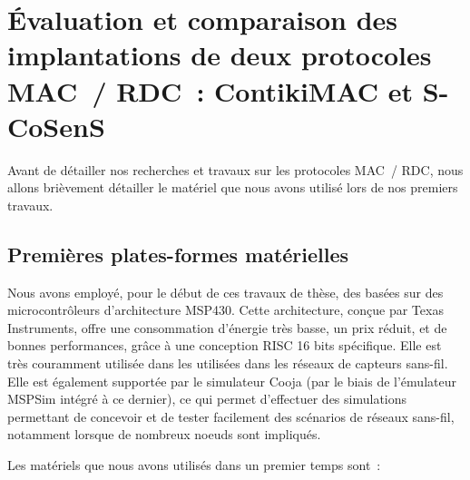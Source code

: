 
\chapter{Évaluation et comparaison des implantations
         de deux protocoles MAC~/ RDC~: ContikiMAC et S-CoSenS}
\label{ChProtocolesMAC}

Avant de détailler nos recherches et travaux sur les protocoles MAC~/
RDC, nous allons brièvement détailler le matériel que nous avons
utilisé lors de nos premiers travaux.


\section{Premières plates-formes matérielles}
\label{SecHWMSP430}

Nous avons employé, pour le début de ces travaux de thèse, des 
basées sur des microcontrôleurs d'architecture MSP430. Cette architecture,
conçue par Texas Instruments, offre une consommation d'énergie très basse,
un prix réduit, et de bonnes performances, grâce à une conception RISC
16 bits spécifique. Elle est très couramment utilisée dans les 
utilisées dans les réseaux de capteurs sans-fil. Elle est également
supportée par le simulateur Cooja \cite{Cooja} (par le biais de l'émulateur
MSPSim \cite{MSPSim} intégré à ce dernier), ce qui permet d'effectuer des
simulations permettant de concevoir et de tester facilement des scénarios
de réseaux sans-fil, notamment lorsque de nombreux noeuds sont impliqués.

\bigskip

Les matériels que nous avons utilisés dans un premier temps sont~:

